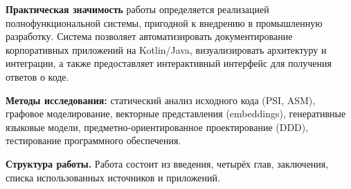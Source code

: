 \textbf{Практическая значимость} работы определяется реализацией полнофункциональной системы, пригодной к внедрению в промышленную разработку. Система позволяет автоматизировать документирование корпоративных приложений на Kotlin/Java, визуализировать архитектуру и интеграции, а также предоставляет интерактивный интерфейс для получения ответов о коде.

\textbf{Методы исследования:} статический анализ исходного кода (PSI, ASM), графовое моделирование, векторные представления (embeddings), генеративные языковые модели, предметно-ориентированное проектирование (DDD), тестирование программного обеспечения.

\textbf{Структура работы.} Работа состоит из введения, четырёх глав, заключения, списка использованных источников и приложений.
